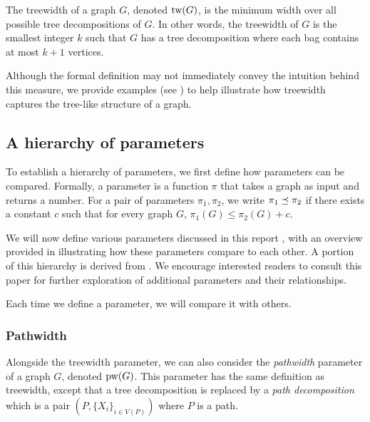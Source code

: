 \begin{definition}[treewidth]
    The treewidth of a graph $G$, denoted $\text{tw}(G)$, is the minimum width over all possible tree decompositions of $G$. In other words, the treewidth of $G$ is the smallest integer $k$ such that $G$ has a tree decomposition where each bag contains at most $k+1$ vertices.
\end{definition}

Although the formal definition may not immediately convey the intuition behind this measure, we provide examples (see ) to help illustrate how treewidth captures the tree-like structure of a graph.



\subsection{A hierarchy of parameters}

To establish a hierarchy of parameters, we first define how parameters can be compared. Formally, a parameter is a function $\pi$ that takes a graph as input and returns a number. For a pair of parameters $\pi_1, \pi_2$, we write $\pi_1 \preceq \pi_2$ if there exists a constant $c$ such that for every graph $G$, $\pi_1(G) \leq \pi_2(G) + c$.

We will now define various parameters discussed in this report , with an overview provided in  illustrating how these parameters compare to each other. A portion of this hierarchy is derived from \cite{fellows2013towards}. We encourage interested readers to consult this paper for further exploration of additional parameters and their relationships.

Each time we define a parameter, we will compare it with others.



\subsubsection*{Pathwidth}

Alongside the treewidth parameter, we can also consider the \textit{pathwidth} parameter of a graph $G$, denoted $\text{pw}(G)$. This parameter has the same definition as treewidth, except that a tree decomposition is replaced by a \textit{path decomposition} which is a pair $(P, \{X_i\}_{i \in V(P)})$ where $P$ is a path.

\medskip

